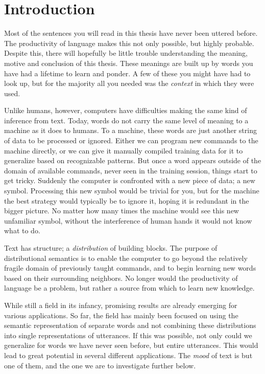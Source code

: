 \chapter{Introduction}
\label{introduction}

Most of the sentences you will read in this thesis have never been uttered before. The productivity of language makes this not only possible, but highly probable. Despite this, there will hopefully be little trouble understanding the meaning, motive and conclusion of this thesis. These meanings are built up by words you have had a lifetime to learn and ponder. A few of these you might have had to look up, but for the majority all you needed was the \emph{context} in which they were used.

Unlike humans, however, computers have difficulties making the same kind of inference from text. Today, words do not carry the same level of meaning to a machine as it does to humans. To a machine, these words are just another string of data to be processed or ignored. Either we can program new commands to the machine directly, or we can give it manually compiled training data for it to generalize based on recognizable patterns. But once a word appears outside of the domain of available commands, never seen in the training session, things start to get tricky. Suddenly the computer is confronted with a new piece of data; a new symbol. Processing this new symbol would be trivial for you, but for the machine the best strategy would typically be to ignore it, hoping it is redundant in the bigger picture. No matter how many times the machine would see this new unfamiliar symbol, without the interference of human hands it would not know what to do.

Text has structure; a \emph{distribution} of building blocks. The purpose of distributional semantics is to enable the computer to go beyond the relatively fragile domain of previously taught commands, and to begin learning new words based on their surrounding neighbors. No longer would the productivity of language be a problem, but rather a source from which to learn new knowledge.

While still a field in its infancy, promising results are already emerging for various applications. So far, the field has mainly been focused on using the semantic representation of separate words and not combining these distributions into single representations of utterances. If this was possible, not only could we generalize for words we have never seen before, but entire utterances. This would lead to great potential in several different applications. The \emph{mood} of text is but one of them, and the one we are to investigate further below.

